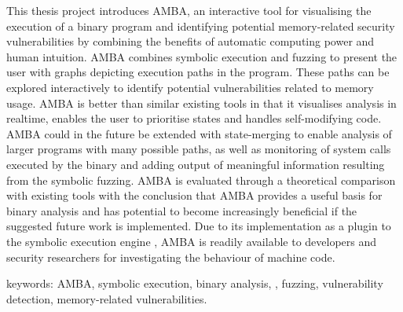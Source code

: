 This thesis project introduces AMBA, an interactive tool for
visualising the execution of a binary program and identifying
potential memory-related security vulnerabilities by combining the
benefits of automatic computing power and human intuition. AMBA
combines symbolic execution and fuzzing to present the user with
graphs depicting execution paths in the program. These paths can be
explored interactively to identify potential vulnerabilities related
to memory usage. AMBA is better than similar existing tools in that it
visualises analysis in realtime, enables the user to prioritise states
and handles self-modifying code. AMBA could in the future be extended
with state-merging to enable analysis of larger programs with many
possible paths, as well as monitoring of system calls executed by the
binary and adding output of meaningful information resulting from the
symbolic fuzzing. AMBA is evaluated through a theoretical comparison
with existing tools with the conclusion that AMBA provides a useful
basis for binary analysis and has potential to become increasingly
beneficial if the suggested future work is implemented. Due to its
implementation as a plugin to the symbolic execution engine \stoe{}, AMBA
is readily available to developers and security researchers for
investigating the behaviour of machine code.


keywords: AMBA, symbolic execution, binary analysis, \stoe{},
fuzzing, vulnerability detection, memory-related vulnerabilities.
